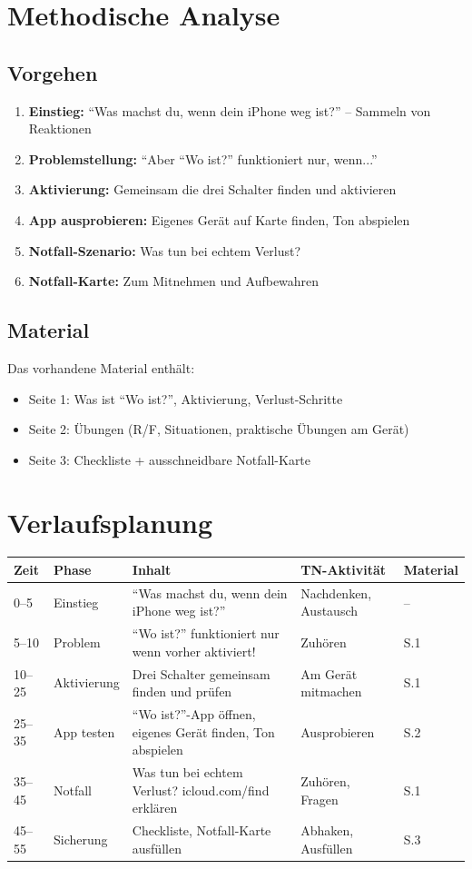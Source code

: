 \documentclass[11pt,a4paper]{article}
\begin{document}
\section{Methodische Analyse}

\subsection{Vorgehen}
\begin{enumerate}
    \item \textbf{Einstieg:} ``Was machst du, wenn dein iPhone weg ist?'' -- Sammeln von Reaktionen
    \item \textbf{Problemstellung:} ``Aber ``Wo ist?'' funktioniert nur, wenn...''
    \item \textbf{Aktivierung:} Gemeinsam die drei Schalter finden und aktivieren
    \item \textbf{App ausprobieren:} Eigenes Gerät auf Karte finden, Ton abspielen
    \item \textbf{Notfall-Szenario:} Was tun bei echtem Verlust?
    \item \textbf{Notfall-Karte:} Zum Mitnehmen und Aufbewahren
\end{enumerate}

\subsection{Material}
Das vorhandene Material enthält:
\begin{itemize}
    \item Seite 1: Was ist ``Wo ist?'', Aktivierung, Verlust-Schritte
    \item Seite 2: Übungen (R/F, Situationen, praktische Übungen am Gerät)
    \item Seite 3: Checkliste + ausschneidbare Notfall-Karte
\end{itemize}

\section{Verlaufsplanung}

\begin{longtable}{|p{1cm}|p{2cm}|p{5cm}|p{3cm}|p{2cm}|}
\hline
\textbf{Zeit} & \textbf{Phase} & \textbf{Inhalt} & \textbf{TN-Aktivität} & \textbf{Material} \\
\hline
0--5 & Einstieg & ``Was machst du, wenn dein iPhone weg ist?'' & Nachdenken, Austausch & -- \\
\hline
5--10 & Problem & ``Wo ist?'' funktioniert nur wenn vorher aktiviert! & Zuhören & S.1 \\
\hline
10--25 & Aktivierung & Drei Schalter gemeinsam finden und prüfen & Am Gerät mitmachen & S.1 \\
\hline
25--35 & App testen & ``Wo ist?''-App öffnen, eigenes Gerät finden, Ton abspielen & Ausprobieren & S.2 \\
\hline
35--45 & Notfall & Was tun bei echtem Verlust? icloud.com/find erklären & Zuhören, Fragen & S.1 \\
\hline
45--55 & Sicherung & Checkliste, Notfall-Karte ausfüllen & Abhaken, Ausfüllen & S.3 \\
\hline
\end{longtable}
\end{document}
